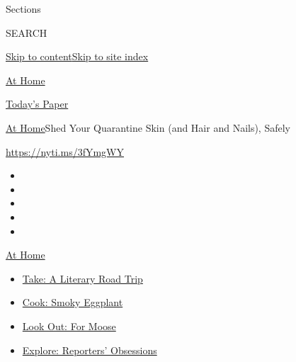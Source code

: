 Sections

SEARCH

\protect\hyperlink{site-content}{Skip to
content}\protect\hyperlink{site-index}{Skip to site index}

\href{https://www.nytimes3xbfgragh.onion/spotlight/at-home}{At Home}

\href{https://myaccount.nytimes3xbfgragh.onion/auth/login?response_type=cookie\&client_id=vi}{}

\href{https://www.nytimes3xbfgragh.onion/section/todayspaper}{Today's
Paper}

\href{/spotlight/at-home}{At Home}\textbar{}Shed Your Quarantine Skin
(and Hair and Nails), Safely

\url{https://nyti.ms/3fYmgWY}

\begin{itemize}
\item
\item
\item
\item
\item
\end{itemize}

\href{https://www.nytimes3xbfgragh.onion/spotlight/at-home?action=click\&pgtype=Article\&state=default\&region=TOP_BANNER\&context=at_home_menu}{At
Home}

\begin{itemize}
\tightlist
\item
  \href{https://www.nytimes3xbfgragh.onion/2020/07/28/books/time-for-a-literary-road-trip.html?action=click\&pgtype=Article\&state=default\&region=TOP_BANNER\&context=at_home_menu}{Take:
  A Literary Road Trip}
\item
  \href{https://www.nytimes3xbfgragh.onion/2020/07/29/magazine/bored-with-your-home-cooking-some-smoky-eggplant-will-fix-that.html?action=click\&pgtype=Article\&state=default\&region=TOP_BANNER\&context=at_home_menu}{Cook:
  Smoky Eggplant}
\item
  \href{https://www.nytimes3xbfgragh.onion/2020/07/27/travel/moose-michigan-isle-royale.html?action=click\&pgtype=Article\&state=default\&region=TOP_BANNER\&context=at_home_menu}{Look
  Out: For Moose}
\item
  \href{https://www.nytimes3xbfgragh.onion/interactive/2020/at-home/even-more-reporters-editors-diaries-lists-recommendations.html?action=click\&pgtype=Article\&state=default\&region=TOP_BANNER\&context=at_home_menu}{Explore:
  Reporters' Obsessions}
\end{itemize}

